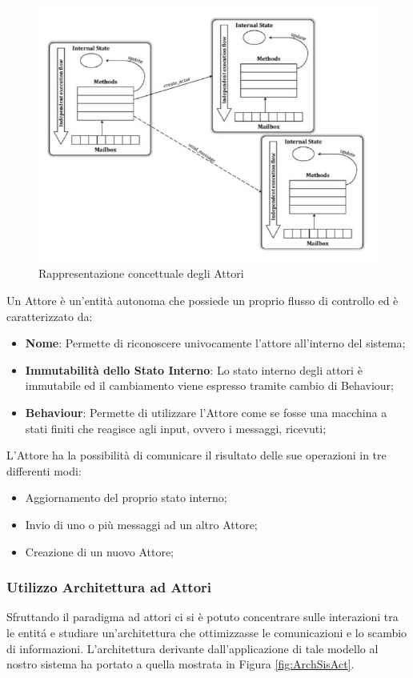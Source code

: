 \begin{figure}[ht]
\centering
\includegraphics[width=\textwidth, scale=0.44]{img/Actor.jpg}
\caption{Rappresentazione concettuale degli Attori}
\label{fig:RapConcDeAct}
\end{figure}

Un Attore \`e un'entit\`a autonoma che possiede un proprio flusso di controllo ed è caratterizzato da:
\begin{itemize}
    \item \textbf{Nome}: Permette di riconoscere univocamente l'attore all'interno del sistema;
    \item \textbf{Immutabilit\`a dello Stato Interno}: Lo stato interno degli attori \`e immutabile ed il cambiamento viene espresso tramite cambio di Behaviour;
    \item \textbf{Behaviour}: Permette di utilizzare l'Attore come se fosse una macchina a stati finiti che reagisce agli input, ovvero i messaggi, ricevuti;
\end{itemize}
L'Attore ha la possibilit\`a di comunicare il risultato delle sue operazioni in tre differenti modi:
\begin{itemize}
    \item Aggiornamento del proprio stato interno;
    \item Invio di uno o pi\`u messaggi ad un altro Attore;
    \item Creazione di un nuovo Attore;
\end{itemize}

\subsubsection{Utilizzo Architettura ad Attori}
Sfruttando il paradigma ad attori ci si è potuto concentrare sulle interazioni tra le entit\'a e studiare un'architettura che ottimizzasse le comunicazioni e lo scambio di informazioni. L'architettura derivante dall'applicazione di tale modello al nostro sistema ha portato a quella mostrata in Figura \ref{fig:ArchSisAct}.

